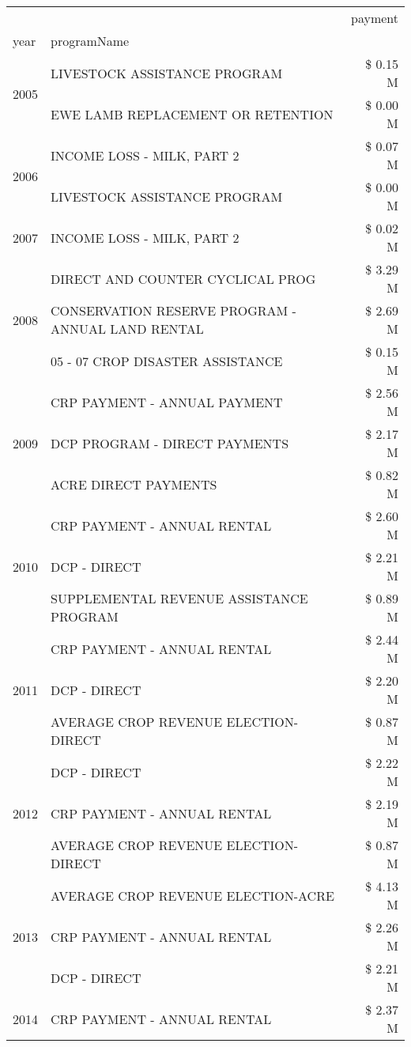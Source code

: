 \begin{tabular}{llr}
\toprule
 &  & payment \\
year & programName &  \\
\midrule
\multirow[t]{2}{*}{2005} & LIVESTOCK ASSISTANCE PROGRAM & \$ 0.15 M \\
 & EWE LAMB REPLACEMENT OR RETENTION & \$ 0.00 M \\
\cline{1-3}
\multirow[t]{2}{*}{2006} & INCOME LOSS - MILK, PART 2 & \$ 0.07 M \\
 & LIVESTOCK ASSISTANCE PROGRAM & \$ 0.00 M \\
\cline{1-3}
2007 & INCOME LOSS - MILK, PART 2 & \$ 0.02 M \\
\cline{1-3}
\multirow[t]{3}{*}{2008} & DIRECT AND COUNTER CYCLICAL PROG & \$ 3.29 M \\
 & CONSERVATION RESERVE PROGRAM - ANNUAL LAND RENTAL & \$ 2.69 M \\
 & 05 - 07 CROP DISASTER ASSISTANCE & \$ 0.15 M \\
\cline{1-3}
\multirow[t]{3}{*}{2009} & CRP PAYMENT - ANNUAL PAYMENT & \$ 2.56 M \\
 & DCP PROGRAM - DIRECT PAYMENTS & \$ 2.17 M \\
 & ACRE DIRECT PAYMENTS & \$ 0.82 M \\
\cline{1-3}
\multirow[t]{3}{*}{2010} & CRP PAYMENT - ANNUAL RENTAL & \$ 2.60 M \\
 & DCP - DIRECT & \$ 2.21 M \\
 & SUPPLEMENTAL REVENUE ASSISTANCE PROGRAM & \$ 0.89 M \\
\cline{1-3}
\multirow[t]{3}{*}{2011} & CRP PAYMENT - ANNUAL RENTAL & \$ 2.44 M \\
 & DCP - DIRECT & \$ 2.20 M \\
 & AVERAGE CROP REVENUE ELECTION-DIRECT & \$ 0.87 M \\
\cline{1-3}
\multirow[t]{3}{*}{2012} & DCP - DIRECT & \$ 2.22 M \\
 & CRP PAYMENT - ANNUAL RENTAL & \$ 2.19 M \\
 & AVERAGE CROP REVENUE ELECTION-DIRECT & \$ 0.87 M \\
\cline{1-3}
\multirow[t]{3}{*}{2013} & AVERAGE CROP REVENUE ELECTION-ACRE & \$ 4.13 M \\
 & CRP PAYMENT - ANNUAL RENTAL & \$ 2.26 M \\
 & DCP - DIRECT & \$ 2.21 M \\
\cline{1-3}
\multirow[t]{3}{*}{2014} & CRP PAYMENT - ANNUAL RENTAL & \$ 2.37 M \\

\end{tabular}
